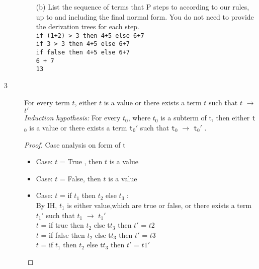 \documentclass{article}
\begin{document}
\begin{description}
\begin{enumerate}
                \item[(b)]{List the sequence of terms that P steps to according to our rules, up to and including the final normal form.
                You do not need to provide the derivation trees for each step.
                }
                    \\
                    \verb|if (1+2) > 3 then 4+5 else 6+7| \\
                    \verb|if 3 > 3 then 4+5 else 6+7| \\
                    \verb|if false then 4+5 else 6+7| \\
                    \verb|6 + 7| \\
                    \verb|13| \\
            \end{enumerate}
        \item[3] {For every term $t$, either $t$ is a value or there exists a term $t$ such that $t$ $\rightarrow$ $t'$}\\
                \textit{Induction hypothesis:} For every $t_0$, where $t_0$ is a subterm of t, then  either \verb|t|$_0$ is a value or there exists a term \verb|t|$_0'$  such that \verb|t|$_0$  $\rightarrow$ \verb|t|$_0'$ .
                \begin{proof}
                    Case analysis on form of t
                    \begin{itemize}
                        \item Case: $t$ = True , then $t$ is a value
                        \item Case: $t$ = False, then $t$ is a value
                        \item Case: $t$ = if $t_1$ then $t_2$ else $t_3$ :\\
                                By IH, $t_1$ is either value,which are true or false, or there exists a term $t_1'$  such that $t_1$  $\rightarrow$ $t_1'$ \\
                                $t$ = if true then $t_2$ else t$t_3$ then $t'$ = $t2$ \\
                                $t$ = if false then $t_2$ else t$t_3$ then $t'$ = $t3$ \\
                                $t$ = if $t_1$ then $t_2$ else t$t_3$ then $t'$ = $t1'$ \\


\end{itemize}
\end{proof}
\end{description}
\end{document}
